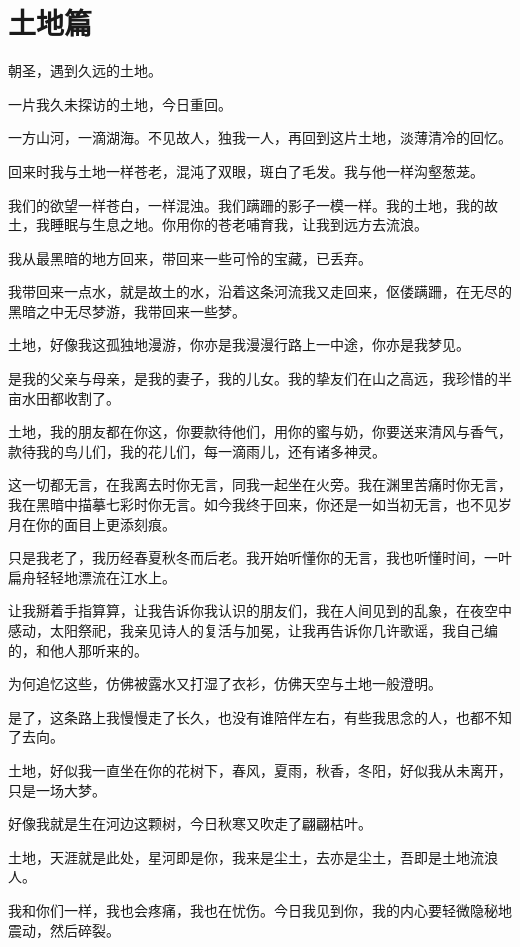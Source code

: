 \documentclass[UTF8]{article}
\begin{document}
\section{土地篇}
\par 朝圣，遇到久远的土地。
\par 一片我久未探访的土地，今日重回。
\par 一方山河，一滴湖海。不见故人，独我一人，再回到这片土地，淡薄清冷的回忆。
\par 回来时我与土地一样苍老，混沌了双眼，斑白了毛发。我与他一样沟壑葱茏。
\par 我们的欲望一样苍白，一样混浊。我们蹒跚的影子一模一样。我的土地，我的故土，我睡眠与生息之地。你用你的苍老哺育我，让我到远方去流浪。
\par 我从最黑暗的地方回来，带回来一些可怜的宝藏，已丢弃。
\par 我带回来一点水，就是故土的水，沿着这条河流我又走回来，伛偻蹒跚，在无尽的黑暗之中无尽梦游，我带回来一些梦。
\par 土地，好像我这孤独地漫游，你亦是我漫漫行路上一中途，你亦是我梦见。
\par 是我的父亲与母亲，是我的妻子，我的儿女。我的挚友们在山之高远，我珍惜的半亩水田都收割了。
\par 土地，我的朋友都在你这，你要款待他们，用你的蜜与奶，你要送来清风与香气，款待我的鸟儿们，我的花儿们，每一滴雨儿，还有诸多神灵。
\par 这一切都无言，在我离去时你无言，同我一起坐在火旁。我在渊里苦痛时你无言，我在黑暗中描摹七彩时你无言。如今我终于回来，你还是一如当初无言，也不见岁月在你的面目上更添刻痕。
\par 只是我老了，我历经春夏秋冬而后老。我开始听懂你的无言，我也听懂时间，一叶扁舟轻轻地漂流在江水上。
\par 让我掰着手指算算，让我告诉你我认识的朋友们，我在人间见到的乱象，在夜空中感动，太阳祭祀，我亲见诗人的复活与加冕，让我再告诉你几许歌谣，我自己编的，和他人那听来的。
\par 为何追忆这些，仿佛被露水又打湿了衣衫，仿佛天空与土地一般澄明。
\par 是了，这条路上我慢慢走了长久，也没有谁陪伴左右，有些我思念的人，也都不知了去向。
\par 土地，好似我一直坐在你的花树下，春风，夏雨，秋香，冬阳，好似我从未离开，只是一场大梦。
\par 好像我就是生在河边这颗树，今日秋寒又吹走了翩翩枯叶。
\par 土地，天涯就是此处，星河即是你，我来是尘土，去亦是尘土，吾即是土地流浪人。
\\[0.6cm]
\par 我和你们一样，我也会疼痛，我也在忧伤。今日我见到你，我的内心要轻微隐秘地震动，然后碎裂。
\end{document}
